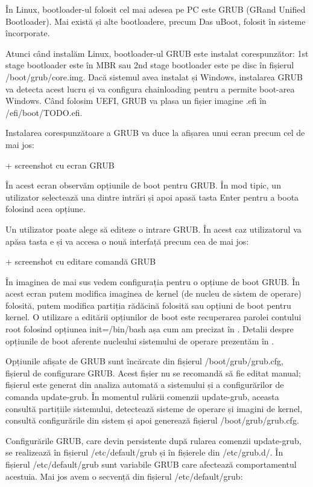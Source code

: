 În Linux, bootloader-ul folosit cel mai adesea pe PC este GRUB (GRand Unified
Bootloader). Mai există și alte bootloadere, precum Das uBoot, folosit în
sisteme încorporate.

Atunci când instalăm Linux, bootloader-ul GRUB este instalat corespunzător: 1st
stage bootloader este în MBR sau 2nd stage bootloader este pe disc în fișierul
/boot/grub/core.img. Dacă sistemul avea instalat și Windows, instalarea GRUB va
detecta acest lucru și va configura chainloading pentru a permite boot-area
Windows. Când folosim UEFI, GRUB va plasa un fișier imagine .efi în
/efi/boot/TODO.efi.

Instalarea corespunzătoare a GRUB va duce la afișarea unui ecran precum cel de
mai jos:

+ screenshot cu ecran GRUB

În acest ecran observăm opțiunile de boot pentru GRUB. În mod tipic, un
utilizator selectează una dintre intrări și apoi apasă tasta Enter pentru a
boota folosind acea opțiune.

Un utilizator poate alege să editeze o intrare GRUB. În acest caz utilizatorul
va apăsa tasta e și va accesa o nouă interfață precum cea de mai jos:

+ screenshot cu editare comandă GRUB

În imaginea de mai sus vedem configurația pentru o opțiune de boot GRUB. În
acest ecran putem modifica imaginea de kernel (de nucleu de sistem de operare)
folosită, putem modifica partiția rădăcină folosită sau opțiuni de boot pentru
kernel. O utilizare a editării opțiunilor de boot este recuperarea parolei
contului root folosind opțiunea init=/bin/bash așa cum am precizat în
. Detalii despre
opțiunile de boot aferente nucleului sistemului de operare prezentăm în
.

Opțiunile afișate de GRUB sunt încărcate din fișierul /boot/grub/grub.cfg,
fișierul de configurare GRUB. Acest fișier nu se recomandă să fie editat manual;
fișierul este generat din analiza automată a sistemului și a configurărilor de
comanda update-grub. În momentul rulării comenzii update-grub, aceasta consultă
partițiile sistemului, detectează sisteme de operare și imagini de kernel,
consultă configurările din sistem și apoi generează fișierul
/boot/grub/grub.cfg.

Configurările GRUB, care devin persistente după rularea comenzii update-grub, se
realizează în fișierul /etc/default/grub și în fișierele din /etc/grub.d/. În
fișierul /etc/default/grub sunt variabile GRUB care afectează comportamentul
acestuia. Mai jos avem o secvență din fișierul /etc/default/grub:

